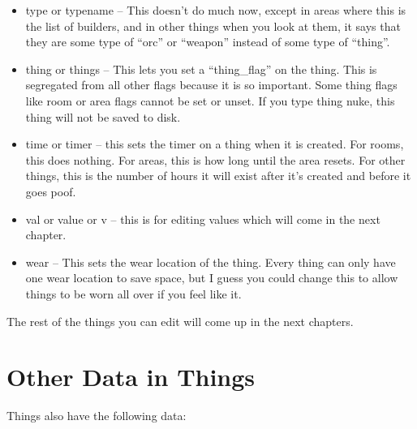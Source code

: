 \begin{itemize}
\item type or typename -- This doesn't do much now, except in areas where this is the list of builders, and in other things when you look at them, it says that they are some type of ``orc'' or ``weapon'' instead of some type of ``thing''.

\item thing or things -- This lets you set a ``thing\_flag'' on the thing. This is segregated from all other flags because it is so important. Some thing flags like room or area flags cannot be set or unset. If you type thing nuke, this thing will not be saved to disk.


\item time or timer -- this sets the timer on a thing when it is created. For rooms, this does nothing. For areas, this is how long until the area resets. For other things, this is the number of hours it will exist after it's created and before it goes poof.


\item val or value or v -- this is for editing values which will come in the next chapter.

\item wear -- This sets the wear location of the thing. Every thing can only have one wear location to save space, but I guess you could change this to allow things to be worn all over if you feel like it.


\end{itemize}


The rest of the things you can edit will come up in the next chapters.


\section{Other Data in Things}

Things also have the following data:

